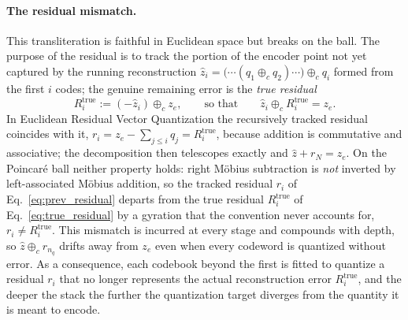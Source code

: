\documentclass[12pt]{report}
\begin{document}
\paragraph{The residual mismatch.} This transliteration is faithful in Euclidean space but breaks on the ball. The purpose of the residual is to track the portion of the encoder point not yet captured by the running reconstruction $\hat z_i = \big(\cdots(q_1\oplus_c q_2)\cdots\big)\oplus_c q_i$ formed from the first $i$ codes; the genuine remaining error is the \emph{true residual}
\begin{equation}
    \label{eq:true_residual}
    R_i^{\text{true}} := (-\hat z_i)\oplus_c z_e,
    \qquad\text{so that}\qquad
    \hat z_i \oplus_c R_i^{\text{true}} = z_e .
\end{equation}
In Euclidean Residual Vector Quantization the recursively tracked residual coincides with it, $r_i = z_e - \sum_{j\le i} q_j = R_i^{\text{true}}$, because addition is commutative and associative; the decomposition then telescopes exactly and $\hat z + r_{N} = z_e$. On the Poincar\'e ball neither property holds: right M\"obius subtraction is \emph{not} inverted by left-associated M\"obius addition, so the tracked residual $r_i$ of Eq.~\ref{eq:prev_residual} departs from the true residual $R_i^{\text{true}}$ of Eq.~\ref{eq:true_residual} by a gyration that the convention never accounts for, $r_i \neq R_i^{\text{true}}$. This mismatch is incurred at every stage and compounds with depth, so $\hat z\oplus_c r_{n_q}$ drifts away from $z_e$ even when every codeword is quantized without error. As a consequence, each codebook beyond the first is fitted to quantize a residual $r_i$ that no longer represents the actual reconstruction error $R_i^{\text{true}}$, and the deeper the stack the further the quantization target diverges from the quantity it is meant to encode.
\end{document}
